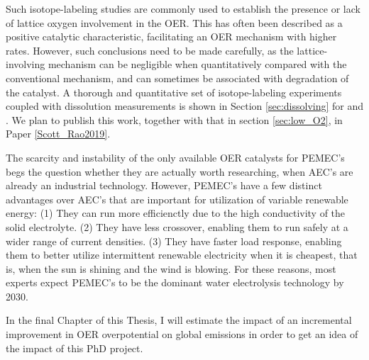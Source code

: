 Such isotope-labeling studies are commonly used to establish the presence or lack of lattice oxygen involvement in the OER. This has often been described as a positive catalytic characteristic, facilitating an OER mechanism with higher rates\cite{Grimaud2017, Geiger2018}. However, such conclusions need to be made carefully, as the lattice-involving mechanism can be negligible when quantitatively compared with the conventional mechanism, and can sometimes be associated with degradation of the catalyst. A thorough and quantitative set of isotope-labeling experiments coupled with dissolution measurements is shown in Section \ref{sec:dissolving} for  and . We plan to publish this work, together with that in section \ref{sec:low_O2}, in Paper \ref{Scott_Rao2019}.


The scarcity and instability of the only available OER catalysts for PEMEC's begs the question whether they are actually worth researching, when AEC's are already an industrial technology. However, PEMEC's have a few distinct advantages over AEC's that are important for utilization of variable renewable energy\cite{Carmo2013}: (1) They can run more efficienctly due to the high conductivity of the solid electrolyte. (2) They have less  crossover, enabling them to run safely at a wider range of current densities. (3) They have faster load response, enabling them to better utilize intermittent renewable electricity when it is cheapest, that is, when the sun is shining and the wind is blowing. For these reasons, most experts expect PEMEC's to be the dominant water electrolysis technology by 2030\cite{Schmidt2017}. 

In the final Chapter of this Thesis, I will estimate the impact of an incremental improvement in OER overpotential on global  emissions in order to get an idea of the impact of this PhD project.